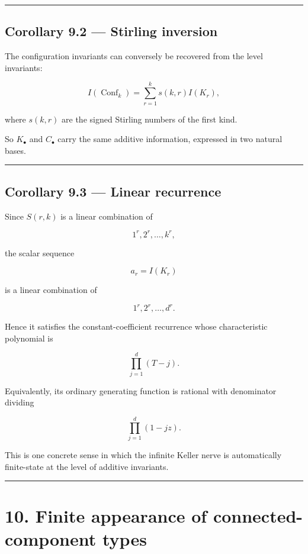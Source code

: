 \begin{center}\rule{0.5\linewidth}{0.5pt}\end{center}

\subsection{Corollary 9.2 --- Stirling
inversion}\label{corollary-9.2-stirling-inversion}

The configuration invariants can conversely be recovered from the level
invariants:

\[
I(\operatorname{Conf}_k)
=
\sum_{r=1}^k s(k,r)I(K_r),
\]

where \(s(k,r)\) are the signed Stirling numbers of the first kind.

So \(K_\bullet\) and \(C_\bullet\) carry the same additive information,
expressed in two natural bases.

\begin{center}\rule{0.5\linewidth}{0.5pt}\end{center}

\subsection{Corollary 9.3 --- Linear
recurrence}\label{corollary-9.3-linear-recurrence}

Since \(S(r,k)\) is a linear combination of

\[
1^r,2^r,\dots,k^r,
\]

the scalar sequence

\[
a_r=I(K_r)
\]

is a linear combination of

\[
1^r,2^r,\dots,d^r.
\]

Hence it satisfies the constant-coefficient recurrence whose
characteristic polynomial is

\[
\boxed{
\prod_{j=1}^d(T-j).
}
\]

Equivalently, its ordinary generating function is rational with
denominator dividing

\[
\prod_{j=1}^d(1-jz).
\]

This is one concrete sense in which the infinite Keller nerve is
automatically finite-state at the level of additive invariants.

\begin{center}\rule{0.5\linewidth}{0.5pt}\end{center}

\section{10. Finite appearance of connected-component
types}\label{finite-appearance-of-connected-component-types}

